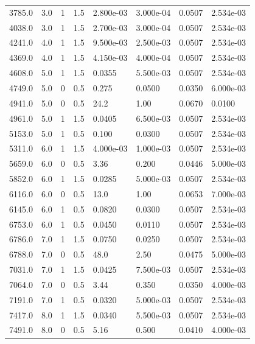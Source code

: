 \documentclass[preview]{standalone}
\begin{document}
{{\begin{tabular}{L{1.2cm}C{1.2cm} C{0.3cm}C{0.5cm} C{1.4cm}C{1.4cm} C{1.4cm}C{1.4cm}}
  3785.0  &   3.0  & 1     & 1.5 &  2.800e-03  & 3.000e-04  & 0.0507 &  2.534e-03   \\ 
  4038.0  &   3.0  & 1     & 1.5 &  2.700e-03  & 3.000e-04  & 0.0507 &  2.534e-03   \\ 
  4241.0  &   4.0  & 1     & 1.5 &  9.500e-03  & 2.500e-03  & 0.0507 &  2.534e-03   \\ 
  4369.0  &   4.0  & 1     & 1.5 &  4.150e-03  & 4.000e-04  & 0.0507 &  2.534e-03   \\ 
  4608.0  &   5.0  & 1     & 1.5 &  0.0355  & 5.500e-03  & 0.0507 &  2.534e-03   \\ 
  4749.0  &   5.0  & 0     & 0.5 &  0.275  & 0.0500  & 0.0350 &  6.000e-03   \\ 
  4941.0  &   5.0  & 0     & 0.5 &  24.2  & 1.00  & 0.0670 &  0.0100   \\ 
  4961.0  &   5.0  & 1     & 1.5 &  0.0405  & 6.500e-03  & 0.0507 &  2.534e-03   \\ 
  5153.0  &   5.0  & 1     & 0.5 &  0.100  & 0.0300  & 0.0507 &  2.534e-03   \\ 
  5311.0  &   6.0  & 1     & 1.5 &  4.000e-03  & 1.000e-03  & 0.0507 &  2.534e-03   \\ 
  5659.0  &   6.0  & 0     & 0.5 &  3.36  & 0.200  & 0.0446 &  5.000e-03   \\ 
  5852.0  &   6.0  & 1     & 1.5 &  0.0285  & 5.000e-03  & 0.0507 &  2.534e-03   \\ 
  6116.0  &   6.0  & 0     & 0.5 &  13.0  & 1.00  & 0.0653 &  7.000e-03   \\ 
  6145.0  &   6.0  & 1     & 0.5 &  0.0820  & 0.0300  & 0.0507 &  2.534e-03   \\ 
  6753.0  &   6.0  & 1     & 0.5 &  0.0450  & 0.0110  & 0.0507 &  2.534e-03   \\ 
  6786.0  &   7.0  & 1     & 1.5 &  0.0750  & 0.0250  & 0.0507 &  2.534e-03   \\ 
  6788.0  &   7.0  & 0     & 0.5 &  48.0  & 2.50  & 0.0475 &  5.000e-03   \\ 
  7031.0  &   7.0  & 1     & 1.5 &  0.0425  & 7.500e-03  & 0.0507 &  2.534e-03   \\ 
  7064.0  &   7.0  & 0     & 0.5 &  3.44  & 0.350  & 0.0350 &  4.000e-03   \\ 
  7191.0  &   7.0  & 1     & 0.5 &  0.0320  & 5.000e-03  & 0.0507 &  2.534e-03   \\ 
  7417.0  &   8.0  & 1     & 1.5 &  0.0340  & 5.500e-03  & 0.0507 &  2.534e-03   \\ 
  7491.0  &   8.0  & 0     & 0.5 &  5.16  & 0.500  & 0.0410 &  4.000e-03   \\ 

\end{tabular}}}
\end{document}
